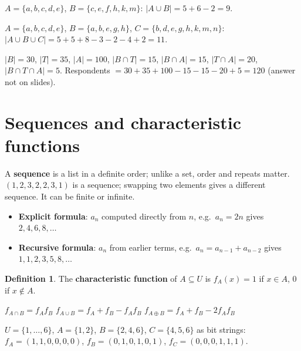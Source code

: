 \documentclass{fkt-notes}
\newcommand{\src}[1]{\par\noindent{\small\itshape Source: #1}\par\smallskip}
\newcommand{\kolman}[1]{\setcounter{section}{\numexpr#1-1\relax}}
\theoremstyle{definition}
\newtheorem*{defn}{Definition}
\begin{document}
\begin{example}[1.2 Ex.~7]
  $A=\{a,b,c,d,e\}$, $B=\{c,e,f,h,k,m\}$: $|A\cup B|=5+6-2=9$.
\end{example}
\begin{example}[1.2 Ex.~8]
  $A=\{a,b,c,d,e\}$, $B=\{a,b,e,g,h\}$, $C=\{b,d,e,g,h,k,m,n\}$:
  $|A\cup B\cup C|=5+5+8-3-2-4+2=11$.
\end{example}
\begin{example}
  $|B|=30$, $|T|=35$, $|A|=100$, $|B\cap T|=15$, $|B\cap A|=15$,
  $|T\cap A|=20$, $|B\cap T\cap A|=5$. Respondents
  $=30+35+100-15-15-20+5=120$ (answer not on slides).
\end{example}

\kolman{3}
\section{Sequences and characteristic functions}\src{Kolman 1.3}
%

A \textbf{sequence} is a list in a definite order; unlike a set, order
and repeats matter. $(1,2,3,2,2,3,1)$ is a sequence; swapping two
elements gives a different sequence. It can be finite or infinite.

\begin{itemize}
  \item \textbf{Explicit formula}: $a_n$ computed directly from $n$, e.g.\
        $a_n=2n$ gives $2,4,6,8,\dots$
  \item \textbf{Recursive formula}: $a_n$ from earlier terms, e.g.\
        $a_n=a_{n-1}+a_{n-2}$ gives $1,1,2,3,5,8,\dots$
\end{itemize}

\begin{defn}
  The \textbf{characteristic function} of $A\subseteq U$ is
  $f_A(x)=1$ if $x\in A$, $0$ if $x\notin A$.
\end{defn}
\begin{rulebox}[title=Theorem 1.3.1]
  $f_{A\cap B}=f_Af_B$ \qquad
  $f_{A\cup B}=f_A+f_B-f_Af_B$ \qquad
  $f_{A\oplus B}=f_A+f_B-2f_Af_B$
\end{rulebox}
\begin{example}[1.3 Ex.~12]
  $U=\{1,\dots,6\}$, $A=\{1,2\}$, $B=\{2,4,6\}$, $C=\{4,5,6\}$ as bit
  strings: $f_A=(1,1,0,0,0,0)$, $f_B=(0,1,0,1,0,1)$,
  $f_C=(0,0,0,1,1,1)$.
\end{example}
\end{document}

